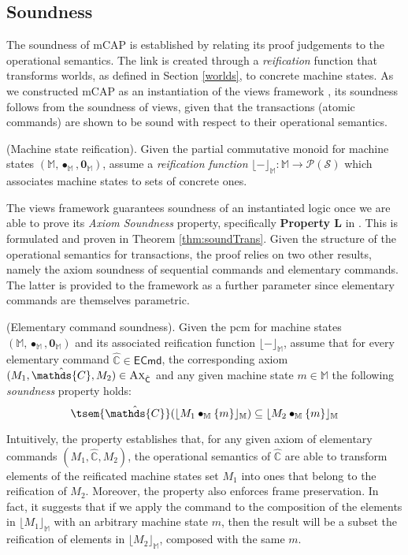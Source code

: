 \subsection{Soundness}

The soundness of mCAP is established by relating its proof judgements to the operational semantics. The link is created through a \textit{reification} function that transforms worlds, as defined in Section \ref{worlds}, to concrete machine states. As we constructed mCAP as an instantiation of the views framework \cite{views}, its soundness follows from the soundness of views, given that the transactions (atomic commands) are shown to be sound with respect to their operational semantics.

\begin{param}
	(Machine state reification).
	Given the partial commutative monoid for machine states $(\mathbb{M}, \bullet_\mathbb{M}, \mathbf{0}_\mathbb{M})$, assume a \emph{reification function} $\lfloor - \rfloor_\mathbb{M} : \mathbb{M} \rightarrow \mathcal{P}(\mathcal{S})$ which associates machine states to sets of concrete ones.
\end{param}

The views framework guarantees soundness of an instantiated logic once we are able to prove its \textit{Axiom Soundness} property, specifically \textbf{Property L} in \cite{views}. This is formulated and proven in Theorem \ref{thm:soundTrans}. Given the structure of the operational semantics for transactions, the proof relies on two other results, namely the axiom soundness of sequential commands and elementary commands. The latter is provided to the framework as a further parameter since elementary commands are themselves parametric.

\begin{param}
	\label{param:ecmdSound}
	(Elementary command soundness).
	Given the pcm for machine states $(\mathbb{M}, \bullet_\mathbb{M}, \mathbf{0}_\mathbb{M})$ and its associated reification function $\lfloor - \rfloor_\mathbb{M}$, assume that for every elementary command $\hat{\mathds{C}} \in \mathsf{ECmd}$, the corresponding axiom $(M_1, \hat{\mathds{C}}, M_2) \in \textsc{Ax}_{\hat{\mathsf{C}}}$ and any given machine state $m \in \mathbb{M}$ the following \emph{soundness} property holds:
	\[
		\tsem{\hat{\mathds{C}}}(\lfloor M_1 \bullet_\mathbb{M} \{m\} \rfloor_\mathbb{M}) \subseteq \lfloor M_2 \bullet_\mathbb{M} \{m\} \rfloor_\mathbb{M}
	\]
\end{param}
Intuitively, the property establishes that, for any given axiom of elementary commands $(M_1, \hat{\mathds{C}}, M_2)$, the operational semantics of $\hat{\mathds{C}}$ are able to transform elements of the reificated machine states set $M_1$ into ones that belong to the reification of $M_2$. Moreover, the property also enforces frame preservation. In fact, it suggests that if we apply the command to the composition of the elements in $\lfloor M_1 \rfloor_\mathbb{M}$ with an arbitrary machine state $m$, then the result will be a subset the reification of elements in $\lfloor M_2 \rfloor_\mathbb{M}$, composed with the same $m$.

